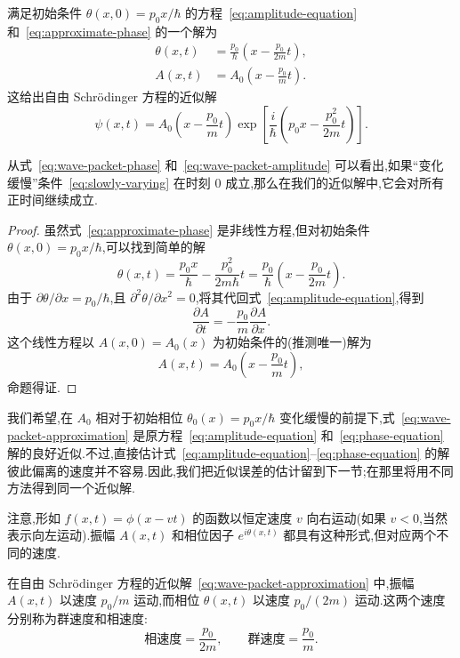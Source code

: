\begin{proposition}[波包传播的第一种近似]\label{prop:wave-packet-first}
满足初始条件 \(\theta(x,0)=p_{0}x/\hbar\) 的方程~\eqref{eq:amplitude-equation} 和~\eqref{eq:approximate-phase} 的一个解为
\begin{align}
\theta(x,t)&=\frac{p_{0}}{\hbar}\left(x-\frac{p_{0}}{2m}t\right),\label{eq:wave-packet-phase}\\
A(x,t)&=A_{0}\left(x-\frac{p_{0}}{m}t\right).\label{eq:wave-packet-amplitude}
\end{align}
这给出自由 Schrödinger 方程的近似解
\begin{equation}
\psi(x,t)=A_{0}\left(x-\frac{p_{0}}{m}t\right)
\exp\left[\frac{i}{\hbar}\left(p_{0}x-\frac{p_{0}^{2}}{2m}t\right)\right].
\label{eq:wave-packet-approximation}
\end{equation}
\end{proposition}

从式~\eqref{eq:wave-packet-phase} 和~\eqref{eq:wave-packet-amplitude} 可以看出,如果“变化缓慢”条件~\eqref{eq:slowly-varying} 在时刻 \(0\) 成立,那么在我们的近似解中,它会对所有正时间继续成立.

\begin{proof}
虽然式~\eqref{eq:approximate-phase} 是非线性方程,但对初始条件 \(\theta(x,0)=p_{0}x/\hbar\),可以找到简单的解
\[
\theta(x,t)=\frac{p_{0}x}{\hbar}-\frac{p_{0}^{2}}{2m\hbar}t
=\frac{p_{0}}{\hbar}\left(x-\frac{p_{0}}{2m}t\right).
\]
由于 \(\partial\theta/\partial x=p_{0}/\hbar\),且 \(\partial^{2}\theta/\partial x^{2}=0\),将其代回式~\eqref{eq:amplitude-equation},得到
\[
\frac{\partial A}{\partial t}
=-\frac{p_{0}}{m}\frac{\partial A}{\partial x}.
\]
这个线性方程以 \(A(x,0)=A_{0}(x)\) 为初始条件的(推测唯一)解为
\[
A(x,t)=A_{0}\left(x-\frac{p_{0}}{m}t\right),
\]
命题得证.
\end{proof}

我们希望,在 \(A_{0}\) 相对于初始相位 \(\theta_{0}(x)=p_{0}x/\hbar\) 变化缓慢的前提下,式~\eqref{eq:wave-packet-approximation} 是原方程~\eqref{eq:amplitude-equation} 和~\eqref{eq:phase-equation} 解的良好近似.不过,直接估计式~\eqref{eq:amplitude-equation}--\eqref{eq:phase-equation} 的解彼此偏离的速度并不容易.因此,我们把近似误差的估计留到下一节;在那里将用不同方法得到同一个近似解.

注意,形如 \(f(x,t)=\phi(x-vt)\) 的函数以恒定速度 \(v\) 向右运动(如果 \(v<0\),当然表示向左运动).振幅 \(A(x,t)\) 和相位因子 \(e^{i\theta(x,t)}\) 都具有这种形式,但对应两个不同的速度.

\begin{conclusion}[群速度与相速度]\label{con:group-phase-velocity}
在自由 Schrödinger 方程的近似解~\eqref{eq:wave-packet-approximation} 中,振幅 \(A(x,t)\) 以速度 \(p_{0}/m\) 运动,而相位 \(\theta(x,t)\) 以速度 \(p_{0}/(2m)\) 运动.这两个速度分别称为群速度和相速度:
\[
\text{相速度}=\frac{p_{0}}{2m},
\qquad
\text{群速度}=\frac{p_{0}}{m}.
\]
\end{conclusion}

